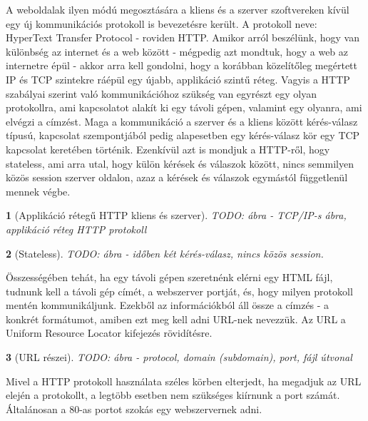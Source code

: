 \documentclass[a4paper, 12pt, oneside]{article}
\newtheorem*{defin}{}
\begin{document}
A weboldalak ilyen módú megosztására a kliens és a szerver szoftvereken kívül egy új kommunikációs protokoll is bevezetésre került. A protokoll neve: HyperText Transfer Protocol - roviden HTTP. Amikor arról beszélünk, hogy van különbség az internet és a web között - mégpedig azt mondtuk, hogy a web az internetre épül - akkor arra kell gondolni, hogy a korábban közelítőleg megértett IP és TCP szintekre ráépül egy újabb, applikáció szintű réteg. Vagyis a HTTP szabályai szerint való kommunikációhoz szükség van egyrészt egy olyan protokollra, ami kapcsolatot alakít ki egy távoli gépen, valamint egy olyanra, ami elvégzi a címzést. Maga a kommunikáció a szerver és a kliens között kérés-válasz típusú, kapcsolat szempontjából pedig alapesetben egy kérés-válasz kör egy TCP kapcsolat keretében történik. Ezenkívül azt is mondjuk a HTTP-ről, hogy stateless, ami arra utal, hogy külön kérések és válaszok között, nincs semmilyen közös session szerver oldalon, azaz a kérések és válaszok egymástól függetlenül mennek végbe.
\begin{center}
\begin{defin}[Applikáció rétegű HTTP kliens és szerver]
TODO: ábra - TCP/IP-s ábra, applikáció réteg HTTP protokoll
\end{defin}
\end{center}
\begin{center}
\begin{defin}[Stateless]
TODO: ábra - időben két kérés-válasz, nincs közös session.
\end{defin}
\end{center}

Összességében tehát, ha egy távoli gépen szeretnénk elérni egy HTML fájl, tudnunk kell a távoli gép címét, a webszerver portját, és, hogy milyen protokoll mentén kommunikáljunk. Ezekből az információkból áll össze a címzés - a konkrét formátumot, amiben ezt meg kell adni URL-nek nevezzük. Az URL a Uniform Resource Locator kifejezés rövidítésre.

\begin{center}
\begin{defin}[URL részei]
TODO: ábra - protocol, domain (subdomain), port, fájl útvonal
\end{defin}
\end{center}

Mivel a HTTP protokoll használata széles körben elterjedt, ha megadjuk az URL elején a protokollt, a legtöbb esetben nem szükséges kiírnunk a port számát. Általánosan a 80-as portot szokás egy webszervernek adni.
\end{document}
